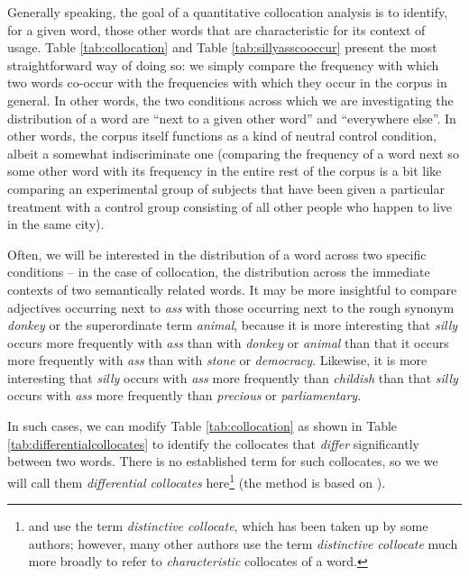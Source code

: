 Generally speaking, the goal of a quantitative collocation analysis is to identify, for a given word, those other words that are characteristic for its context of usage. Table \ref{tab:collocation} and Table \ref{tab:sillyasscooccur} present the most straightforward way of doing so: we simply compare the frequency with which two words co-occur with the frequencies with which they occur in the corpus in general. In other words, the two conditions across which we are investigating the distribution of a word are ``next to a given other word'' and ``everywhere else''. In other words, the corpus itself functions as a kind of neutral control condition, albeit a somewhat indiscriminate one (comparing the frequency of a word next so some other word with its frequency in the entire rest of the corpus is a bit like comparing an experimental group of subjects that have been given a particular treatment with a control group consisting of all other people who happen to live in the same city).

Often, we will be interested in the distribution of a word across two specific conditions -- in the case of collocation, the distribution across the immediate contexts of two semantically related words. It may be more insightful to compare adjectives occurring next to \textit{ass} with those occurring next to the rough synonym \textit{donkey} or the superordinate term \textit{animal}, because it is more interesting that \textit{silly} occurs more frequently with \textit{ass} than with \textit{donkey} or \textit{animal} than that it occurs more frequently with \textit{ass} than with \textit{stone} or \textit{democracy}. Likewise, it is more interesting that \textit{silly} occurs with \textit{ass} more frequently than \textit{childish} than that \textit{silly} occurs with \textit{ass} more frequently than \textit{precious} or \textit{parliamentary}.

In such cases, we can modify Table \ref{tab:collocation} as shown in Table \ref{tab:differentialcollocates} to identify the collocates that \textit{differ} significantly between two words. There is no established term for such collocates, so we we will call them \textit{differential collocates} here\footnote{\citet{gries_testing_2003} and \citet{gries_extending_2004} use the term \textit{distinctive collocate}, which has been taken up by some authors; however, many other authors use the term \textit{distinctive collocate} much more broadly to refer to \textit{characteristic} collocates of a word.} (the method is based on \citet{church_using_1991}).

